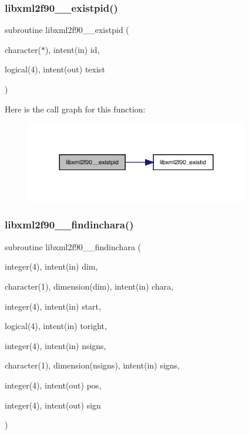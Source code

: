 \subsubsection{\texorpdfstring{libxml2f90\+\_\+\+\_\+existpid()}{libxml2f90\_\_existpid()}}
{\footnotesize\ttfamily subroutine libxml2f90\+\_\+\+\_\+existpid (\begin{DoxyParamCaption}\item[{character($\ast$), intent(in)}]{id,  }\item[{logical(4), intent(out)}]{texist }\end{DoxyParamCaption})}

Here is the call graph for this function\+:
\nopagebreak
\begin{figure}[H]
\begin{center}
\leavevmode
\includegraphics[width=276pt]{libxml2f90_8f90__pp_8f90_a6269f2e5870605109c32aadf4a17808c_cgraph}
\end{center}
\end{figure}
\mbox{\label{libxml2f90_8f90__pp_8f90_a32693bbc0bcd62439a95f4e0a2d4da6d}} 
\subsubsection{\texorpdfstring{libxml2f90\+\_\+\+\_\+findinchara()}{libxml2f90\_\_findinchara()}}
{\footnotesize\ttfamily subroutine libxml2f90\+\_\+\+\_\+findinchara (\begin{DoxyParamCaption}\item[{integer(4), intent(in)}]{dim,  }\item[{character(1), dimension(dim), intent(in)}]{chara,  }\item[{integer(4), intent(in)}]{start,  }\item[{logical(4), intent(in)}]{toright,  }\item[{integer(4), intent(in)}]{nsigns,  }\item[{character(1), dimension(nsigns), intent(in)}]{signs,  }\item[{integer(4), intent(out)}]{pos,  }\item[{integer(4), intent(out)}]{sign }\end{DoxyParamCaption})}

